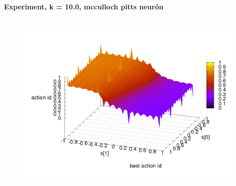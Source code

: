 \documentclass[xcolor=dvipsnames]{beamer}
\begin{document}
\begin{frame}{\bf Experiment, k = 10.0, mcculloch pitts neurón}
\begin{columns}
\begin{column}{0.5\textwidth}
\begin{figure}[ht]
        \begin{center}
        \includegraphics[width=1.0\textwidth]{experiment_03/mcculloch_pitts_neuron/q_action_id.png}
        \end{center}

        \end{figure}

	\end{column}
\end{columns}

\end{frame}
\end{document}
